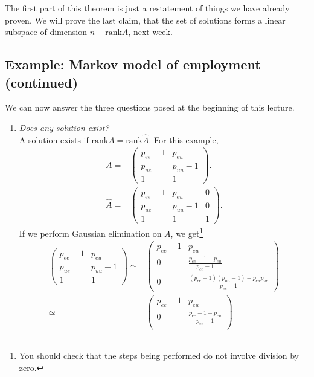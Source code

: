 \documentclass[12pt,reqno]{amsart}
\newcommand{\rank}{\mathrm{rank}}
\theoremstyle{definition}
\begin{document}
The first part of this theorem is just a restatement of things we have
already proven. We will prove the last claim, that the set of solutions
forms a linear subspace of dimension $n - \rank A$, next week.

\subsection*{Example: Markov model of employment (continued)}
We can now answer the three questions posed at the beginning of this
lecture. 
\renewcommand{\theenumi}{\arabic{enumi}}
\begin{enumerate}
\item \emph{Does any solution exist? } \\
  A solution exists if $\rank A = \rank \hat{A}$. For this example, 
  \begin{align*}
    A = & \begin{pmatrix} 
      p_{ee} - 1 & p_{eu}  \\ 
      p_{ue} & p_{uu}-1  \\ 
      1 & 1  \end{pmatrix}.  \\
    \hat{A} = & \begin{pmatrix} 
      p_{ee} - 1 & p_{eu} & 0 \\ 
      p_{ue} & p_{uu}-1 & 0 \\ 
      1 & 1 & 1 \end{pmatrix}. 
  \end{align*}
If we perform Gaussian elimination on $A$, we get\footnote{You should
  check that the steps being performed do not involve division by
  zero.}
\begin{align*}
  \begin{pmatrix} 
    p_{ee} - 1 & p_{eu}  \\ 
    p_{ue} & p_{uu}-1  \\ 
    1 & 1  \end{pmatrix} \simeq & 
  \begin{pmatrix} 
    p_{ee} - 1 & p_{eu}  \\ 
    0 & \frac{p_{ee}- 1 - p_{eu}}{p_{ee}-1}  \\
    0 & \frac{(p_{ee}-1) (p_{uu}- 1) - p_{eu} p_{ue}}{p_{ee}-1} 
  \end{pmatrix} \\
  \simeq &  
  \begin{pmatrix} 
    p_{ee} - 1 & p_{eu}  \\ 
    0 & \frac{p_{ee}- 1 - p_{eu}}{p_{ee}-1}  \\

\end{pmatrix}
\end{align*}
\end{enumerate}
\end{document}
